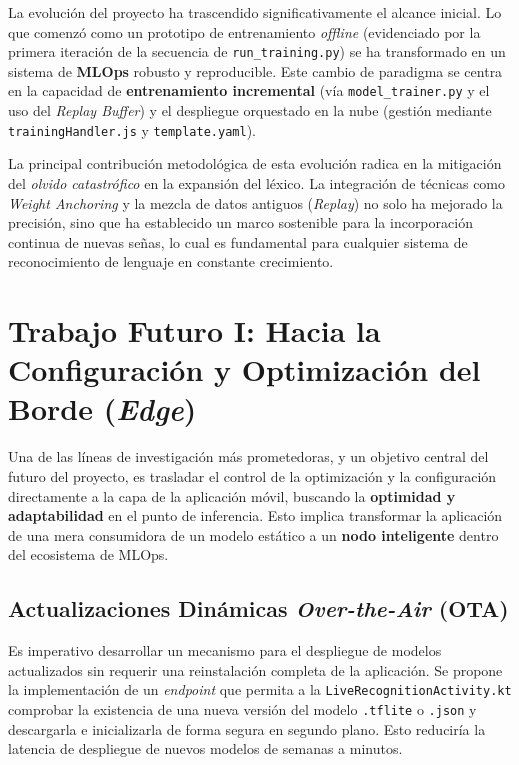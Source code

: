 \par La evolución del proyecto ha trascendido significativamente el alcance inicial. Lo que comenzó como un prototipo de entrenamiento \textit{offline} (evidenciado por la primera iteración de la secuencia de \lstinline|run_training.py|) se ha transformado en un sistema de \textbf{MLOps} robusto y reproducible. Este cambio de paradigma se centra en la capacidad de \textbf{entrenamiento incremental} (vía \lstinline|model_trainer.py| y el uso del \textit{Replay Buffer}) y el despliegue orquestado en la nube (gestión mediante \lstinline|trainingHandler.js| y \lstinline|template.yaml|).
\par La principal contribución metodológica de esta evolución radica en la mitigación del \textit{olvido catastrófico} en la expansión del léxico. La integración de técnicas como \textit{Weight Anchoring} y la mezcla de datos antiguos (\textit{Replay}) no solo ha mejorado la precisión, sino que ha establecido un marco sostenible para la incorporación continua de nuevas señas, lo cual es fundamental para cualquier sistema de reconocimiento de lenguaje en constante crecimiento.

\section{Trabajo Futuro I: Hacia la Configuración y Optimización del Borde (\textit{Edge})}
\label{sec:optimizacion_app}

\par Una de las líneas de investigación más prometedoras, y un objetivo central del futuro del proyecto, es trasladar el control de la optimización y la configuración directamente a la capa de la aplicación móvil, buscando la \textbf{optimidad y adaptabilidad} en el punto de inferencia. Esto implica transformar la aplicación de una mera consumidora de un modelo estático a un \textbf{nodo inteligente} dentro del ecosistema de MLOps.

\subsection{Actualizaciones Dinámicas \textit{Over-the-Air} (OTA)}
\par Es imperativo desarrollar un mecanismo para el despliegue de modelos actualizados sin requerir una reinstalación completa de la aplicación. Se propone la implementación de un \textit{endpoint} que permita a la \lstinline|LiveRecognitionActivity.kt| comprobar la existencia de una nueva versión del modelo \lstinline|.tflite| o \lstinline|.json| y descargarla e inicializarla de forma segura en segundo plano. Esto reduciría la latencia de despliegue de nuevos modelos de semanas a minutos.

